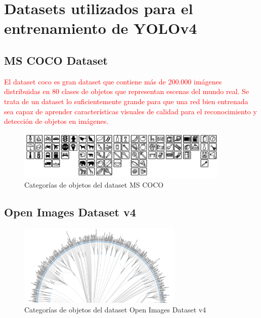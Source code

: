\newpage

\section{Datasets utilizados para el entrenamiento de YOLOv4}
\label{sec:datasets-utilizados}

\subsection{MS COCO Dataset}
\label{subsec:coco-dataset}

\textcolor{red}{El dataset \gls{coco} es gran dataset que contiene más de 200.000 imágenes distribuidas en 80 clases de objetos que representan escenas del mundo real. Se trata de un dataset lo suficientemente grande para que una red bien entrenada sea capaz de aprender características visuales de calidad para el reconocimiento y detección de objetos en imágenes.}

\begin{figure}[ht]
\centering
\includegraphics[width=0.9\textwidth]{img/chapters/resultados/datasets/cocodataset.png}
\caption{\label{fig:cocodataset}Categorías de objetos del dataset MS COCO}
\end{figure}

\newpage

\subsection{Open Images Dataset v4}
\label{subsec:OIDv4-dataset}

\begin{figure}[ht]
\centering
\includegraphics[width=0.7\textwidth]{img/chapters/resultados/datasets/oid-classes.png}
\caption{\label{fig:oiddataset}Categorías de objetos del dataset Open Images Dataset v4}
\end{figure}

